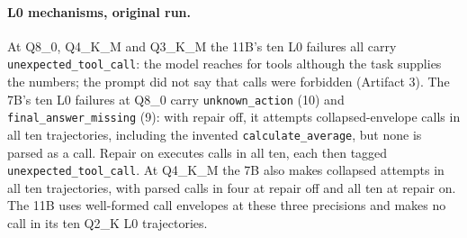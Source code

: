 \documentclass[11pt]{article}
\begin{document}
\paragraph{L0 mechanisms, original run.} At Q8\_0, Q4\_K\_M and Q3\_K\_M the 11B's ten L0 failures all carry \texttt{unexpected\_tool\_call}: the model reaches for tools although the task supplies the numbers; the prompt did not say that calls were forbidden (Artifact 3). The 7B's ten L0 failures at Q8\_0 carry \texttt{unknown\_action} (10) and \texttt{final\_answer\_missing} (9): with repair off, it attempts collapsed-envelope calls in all ten trajectories, including the invented \texttt{calculate\_average}, but none is parsed as a call. Repair on executes calls in all ten, each then tagged \texttt{unexpected\_tool\_call}. At Q4\_K\_M the 7B also makes collapsed attempts in all ten trajectories, with parsed calls in four at repair off and all ten at repair on. The 11B uses well-formed call envelopes at these three precisions and makes no call in its ten Q2\_K L0 trajectories.
\end{document}
